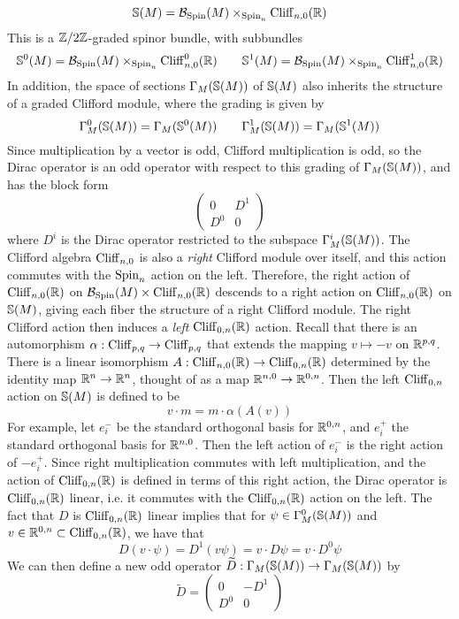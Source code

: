 \[
\S(M) = \B_{\Spin}(M) \times_{\Spin_n} \Cliff_{n,0}(\R)
\]
This is a $\Z/2\Z$-graded spinor bundle, with subbundles
\[
\S^0(M) = \B_{\Spin}(M) \times_{\Spin_n} \Cliff_{n,0}^0(\R) \qquad
\S^1(M) = \B_{\Spin}(M) \times_{\Spin_n} \Cliff_{n,0}^1(\R)
\]
In addition, the space of sections $\Gamma_M(\S(M))$ of $\S(M)$ also inherits the
structure of a graded Clifford module, where the grading is given by
\[
\Gamma_M^0(\S(M)) = \Gamma_M(\S^0(M)) \qquad \Gamma_M^1(\S(M)) = \Gamma_M(\S^1(M))
\]
Since multiplication by a vector is odd, Clifford multiplication is odd, so
the Dirac operator is an odd operator with respect to this grading of $\Gamma_M(\S(M))$,
and has the block form
\[
\begin{pmatrix}
0 & D^1 \\
D^0 & 0
\end{pmatrix}
\]
where $D^i$ is the Dirac operator restricted to the subspace $\Gamma_M^i(\S(M))$.
The Clifford algebra $\Cliff_{n,0}$ is also a \emph{right} Clifford module over
itself, and this action commutes with the $\Spin_n$ action on the left. Therefore,
the right action of $\Cliff_{n,0}(\R)$ on $\B_{\Spin}(M) \times \Cliff_{n,0}(\R)$
descends to a right action on $\Cliff_{n,0}(\R)$ on $\S(M)$, giving each fiber
the structure of a right Clifford module. The right Clifford action then induces
a \emph{left} $\Cliff_{0,n}(\R)$ action. Recall that there is an automorphism
$\alpha : \Cliff_{p,q} \to \Cliff_{p,q}$ that extends the mapping $v \mapsto -v$
on $\R^{p,q}$. There is a linear isomorphism $A : \Cliff_{n,0}(\R) \to \Cliff_{0,n}(\R)$
determined by the identity map $\R^n \to \R^n$, thought of as a map
$\R^{n,0} \to \R^{0,n}$. Then the left $\Cliff_{0,n}$ action on $\S(M)$ is defined
to be
\[
v \cdot m = m \cdot \alpha(A(v))
\]
For example, let $e_i^-$ be the standard orthogonal basis for $\R^{0,n}$, and
$e_i^+$ the standard orthogonal basis for $\R^{n,0}$. Then the left action of
$e_i^-$ is the right action of $-e_i^+$. Since right multiplication commutes
with left multiplication, and the action of $\Cliff_{0,n}(\R)$ is defined
in terms of this right action, the Dirac operator is $\Cliff_{0,n}(\R)$ linear,
i.e. it commutes with the $\Cliff_{0,n}(\R)$ action on the left.
The fact that $D$ is $\Cliff_{0,n}(\R)$ linear implies that for
$\psi \in \Gamma^0_M(\S(M))$ and $v \in \R^{0,n} \subset \Cliff_{0,n}(\R)$, we have that
\[
D(v\cdot\psi) = D^1(v\psi) = v\cdot D\psi = v \cdot D^0\psi
\]
We can then define a new odd operator
$\widetilde{D} : \Gamma_M(\S(M)) \to \Gamma_M(\S(M))$ by
\[
\widetilde{D} =\begin{pmatrix}
0 & -D^1 \\
D^0 & 0
\end{pmatrix}
\]
